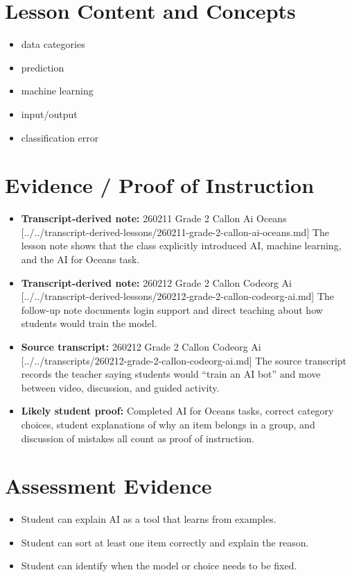 \documentclass[11pt]{article}
\begin{document}
\section*{Lesson Content and Concepts}
\begin{itemize}[leftmargin=*]
\item data categories
\item prediction
\item machine learning
\item input/output
\item classification error
\end{itemize}

\section*{Evidence / Proof of Instruction}
\begin{itemize}[leftmargin=*]
\item \textbf{Transcript-derived note:} 260211 Grade 2 Callon Ai Oceans [../../transcript-derived-lessons/260211-grade-2-callon-ai-oceans.md] The lesson note shows that the class explicitly introduced AI, machine learning, and the AI for Oceans task.
\item \textbf{Transcript-derived note:} 260212 Grade 2 Callon Codeorg Ai [../../transcript-derived-lessons/260212-grade-2-callon-codeorg-ai.md] The follow-up note documents login support and direct teaching about how students would train the model.
\item \textbf{Source transcript:} 260212 Grade 2 Callon Codeorg Ai [../../transcripts/260212-grade-2-callon-codeorg-ai.md] The source transcript records the teacher saying students would “train an AI bot” and move between video, discussion, and guided activity.
\item \textbf{Likely student proof:} Completed AI for Oceans tasks, correct category choices, student explanations of why an item belongs in a group, and discussion of mistakes all count as proof of instruction.
\end{itemize}

\section*{Assessment Evidence}
\begin{itemize}[leftmargin=*]
\item Student can explain AI as a tool that learns from examples.
\item Student can sort at least one item correctly and explain the reason.
\item Student can identify when the model or choice needs to be fixed.
\end{itemize}
\end{document}

